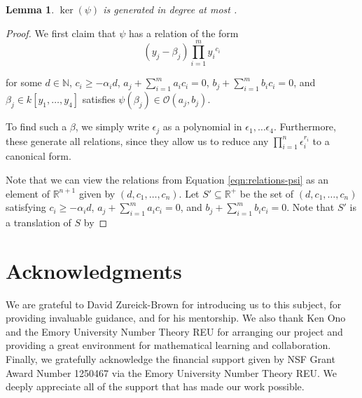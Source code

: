 \documentclass{amsart}
\theoremstyle{plain}
\newtheorem{lem}[thm]{Lemma}
\theoremstyle{definition}
\theoremstyle{remark}
\numberwithin{equation}{section}
\newcommand\bida{a}
\newcommand\bidb{b}
\begin{document}
\begin{lem}
$\ker(\psi)$ is generated in degree at most .
\end{lem}

\begin{proof}
We first claim that $\psi$ has a relation of the form
\begin{equation}\label{eqn:relations-psi}
	(y_j - \beta_j)\prod_{i=1}^m {y_i}^{c_{i}}
\end{equation}

\noindent
for some $d\in \mathbb{N}$, $c_i \ge -\alpha_i d$, $\bida_j + \sum_{i = 1}
^m \bida_i c_i = 0$, $\bidb_j + \sum_{i=1}^m \bidb_i c_i = 0$, and $\beta_j \in
k[y_1, \ldots, y_4]$ satisfies $\psi(\beta_j)\in \mathscr{O}(\bida_j,
\bidb_j)$.

To find such a $\beta$, we simply write $\epsilon_j$ as a 
polynomial in $\epsilon_1, \ldots \epsilon _4$. Furthermore, these
generate all relations, since they allow us to reduce any $\prod_{i =
1}^n \epsilon_i^{r_i}$ to a canonical form. 

Note that we can view the relations from Equation
\ref{eqn:relations-psi} as an element of $\mathbb{R}^{n+1}$ given
by $(d, c_1, \ldots, c_n)$.  Let $S'\subseteq \mathbb{R}^{+}$ be the
set of $(d, c_1, \ldots, c_n)$ satisfying $c_i \ge -\alpha_i d$,
$\bida_j + \sum_{i = 1}^m \bida_i c_i = 0$, and $\bidb_j + \sum_{i=1}^m \bidb_i c_i
= 0$.  Note that $S'$ is a translation of $S$ by 

\end{proof}



\section{Acknowledgments}
We are grateful to David Zureick-Brown for introducing us to this
subject, for providing invaluable guidance,
and for his mentorship. We also thank Ken Ono and the
Emory University Number Theory REU for arranging our project and
providing a great environment for mathematical learning and
collaboration.
Finally, we gratefully acknowledge the financial support given by
NSF Grant Award Number 1250467 via the Emory University Number
Theory REU. We deeply appreciate all of the support that has made
our work possible.


\nocite{*}
{}

\end{document}
